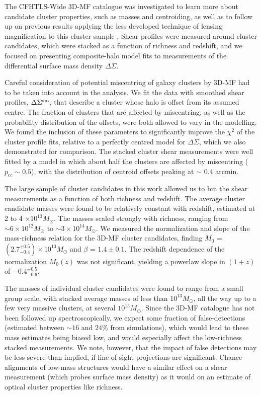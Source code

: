 The \ac{CFHTLS}-Wide \ac{3D-MF} catalogue was investigated to learn more about candidate cluster properties, such as masses and centroiding, as well as to follow up on previous results applying the less developed technique of lensing magnification to this cluster sample \citep{Ford14}. Shear profiles were measured around cluster candidates, which were stacked as a function of richness and redshift, and we focused on presenting composite-halo model fits to measurements of the differential surface mass density $\Delta\Sigma$. 

Careful consideration of potential miscentring of galaxy clusters by \ac{3D-MF} had to be taken into account in the analysis. We fit the data with smoothed shear profiles, $\Delta\Sigma^{\rm sm}$, that describe a cluster whose halo is offset from its assumed centre. The fraction of clusters that are affected by miscentring, as well as the probability distribution of the offsets, were both allowed to vary in the modelling. We found the inclusion of these parameters to significantly improve the $\chi^2$ of the cluster profile fits, relative to a perfectly centred model for $\Delta\Sigma$, which we also demonstrated for comparison. The stacked cluster shear measurements were well fitted by a model in which about half the clusters are affected by miscentring ($p_{\mathrm{cc}} \sim 0.5$), with the distribution of centroid offsets peaking at $\sim$ 0.4 arcmin.

The large sample of cluster candidates in this work allowed us to bin the shear measurements as a function of both richness and redshift. The average cluster candidate masses were found to be relatively constant with redshift, estimated at 2 to 4 $\times 10^{13} M_{\odot}$. The masses scaled strongly with richness, ranging from $\sim 6 \times 10^{12} M_{\odot}$ to $\sim 3 \times 10^{14} M_{\odot}$. We measured the normalization and slope of the mass-richness relation for the \ac{3D-MF} cluster candidates, finding $M_0$ = $(2.7^{+0.5}_{-0.4}) \times 10^{13} M_{\odot}$ and $\beta$ = $1.4 \pm 0.1$. The redshift dependence of the normalization $M_0 (z)$ was not significant, yielding a powerlaw slope in $(1+z)$ of $-0.4^{+0.5}_{-0.6}$. 

The masses of individual cluster candidates were found to range from a small group scale, with stacked average masses of less than $10^{13} M_{\odot}$, all the way up to a few very massive clusters, at several $10^{15} M_{\odot}$. Since the \ac{3D-MF} catalogue has not been followed up spectroscopically, we expect some fraction of false-detections (estimated between $\sim 16$ and $24$\% from simulations), which would lead to these mass estimates being biased low, and would especially affect the low-richness stacked measurements. We note, however, that the impact of false detections may be less severe than implied, if line-of-sight projections are significant. Chance alignments of low-mass structures would have a similar effect on a shear measurement (which probes surface mass density) as it would on an estimate of optical cluster properties like richness.

